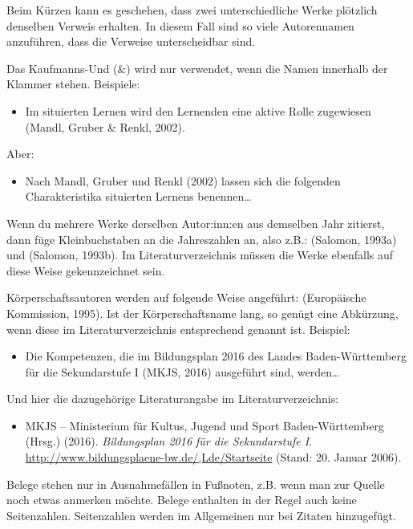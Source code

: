 \documentclass{../cssheet}
\begin{document}
Beim Kürzen kann es geschehen, dass zwei unterschiedliche Werke
plötzlich denselben Verweis erhalten. In diesem Fall sind so viele
Autorennamen anzuführen, dass die Verweise unterscheidbar sind.

Das Kaufmanns-Und (\&) wird nur verwendet, wenn die Namen innerhalb der
Klammer stehen. Beispiele:

\begin{itemize}
\item
  Im situierten Lernen wird den Lernenden eine aktive Rolle zugewiesen
  (Mandl, Gruber \& Renkl, 2002).
\end{itemize}

Aber:

\begin{itemize}
\item
  Nach Mandl, Gruber und Renkl (2002) lassen sich die folgenden
  Charakteristika situierten Lernens benennen\ldots{}
\end{itemize}

Wenn du mehrere Werke derselben Autor:inn:en aus demselben Jahr zitierst,
dann füge Kleinbuchstaben an die Jahreszahlen an, also z.B.: (Salomon,
1993a) und (Salomon, 1993b). Im Literaturverzeichnis müssen die Werke
ebenfalls auf diese Weise gekennzeichnet sein.

Kör\-per\-schafts\-au\-to\-ren werden auf folgende Weise angeführt: (Eu\-ro\-päi\-sche Kommission, 1995). Ist der Körperschaftsname lang, so genügt eine
Abkürzung, wenn diese im Literaturverzeichnis entsprechend genannt ist.
Beispiel:

\begin{itemize}
\item
  Die Kompetenzen, die im Bildungsplan 2016 des Landes Baden-Württemberg
  für die Sekundarstufe I (MKJS, 2016) ausgeführt sind, werden\ldots{}
\end{itemize}

Und hier die dazugehörige Literaturangabe im Literaturverzeichnis:

\begin{itemize}
\item
  MKJS -- Ministerium für Kultus, Jugend und Sport Baden-Württemberg (Hrsg.) (2016). \emph{Bildungsplan 2016 für die Sekundarstufe I}. \url{http://www.bildungsplaene-bw.de/,Lde/Startseite} (Stand: 20. Januar 2006).
\end{itemize}

Belege stehen nur in Ausnahmefällen in Fußnoten, z.B. wenn man zur
Quelle noch etwas anmerken möchte. Belege enthalten in der Regel auch
keine Seitenzahlen. Seitenzahlen werden im Allgemeinen nur bei Zitaten
hinzugefügt.
\end{document}
